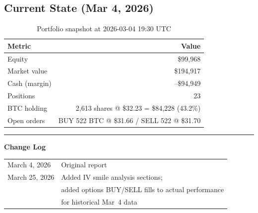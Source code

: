 \documentclass[11pt,letterpaper]{article}
\begin{document}
\subsection{Current State (Mar 4, 2026)}

\begin{table}[H]
\centering
\caption{Portfolio snapshot at 2026-03-04 19:30 UTC}
\begin{tabular}{lr}
\toprule
Metric & Value \\
\midrule
Equity & \$99,968 \\
Market value & \$194,917 \\
Cash (margin) & --\$94,949 \\
Positions & 23 \\
BTC holding & 2,613 shares @ \$32.23 = \$84,228 (43.2\%) \\
Open orders & BUY 522 BTC @ \$31.66 / SELL 522 @ \$31.70 \\
\bottomrule
\end{tabular}
\end{table}

\vfill
\noindent\rule{\textwidth}{0.4pt}
\begin{small}
\noindent\textbf{Change Log} \\[2pt]
\begin{tabular}{@{}ll}
March 4, 2026  & Original report \\
March 25, 2026 & Added IV smile analysis sections; \\
               & added options BUY/SELL fills to actual performance \\
               & for historical Mar~4 data \\
\end{tabular}
\end{small}
\end{document}
